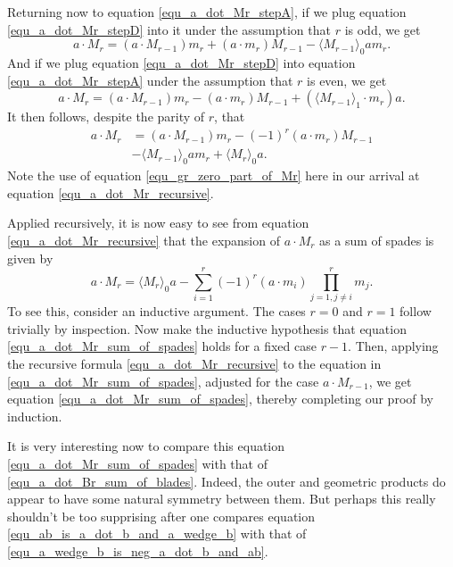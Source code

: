 \documentclass{birkjour}
\theoremstyle{definition}
\theoremstyle{remark}
\numberwithin{equation}{section}
\begin{document}
Returning now to equation \eqref{equ_a_dot_Mr_stepA}, if we plug equation \eqref{equ_a_dot_Mr_stepD} into it
under the assumption that $r$ is odd, we get
\begin{equation}
a\cdot M_r = (a\cdot M_{r-1})m_r + (a\cdot m_r)M_{r-1} - \langle M_{r-1}\rangle_0am_r.
\end{equation}
And if we plug equation \eqref{equ_a_dot_Mr_stepD} into equation \eqref{equ_a_dot_Mr_stepA} under the assumption
that $r$ is even, we get
\begin{equation}
a\cdot M_r = (a\cdot M_{r-1})m_r - (a\cdot m_r)M_{r-1} + (\langle M_{r-1}\rangle_1\cdot m_r)a.
\end{equation}
It then follows, despite the parity of $r$, that
\begin{align}
a\cdot M_r &= (a\cdot M_{r-1})m_r - (-1)^r(a\cdot m_r)M_{r-1}\nonumber \\
 &- \langle M_{r-1}\rangle_0am_r + \langle M_r\rangle_0a.\label{equ_a_dot_Mr_recursive}
\end{align}
Note the use of equation \eqref{equ_gr_zero_part_of_Mr} here in our arrival at equation \eqref{equ_a_dot_Mr_recursive}.

Applied recursively, it is now easy to see from equation \eqref{equ_a_dot_Mr_recursive} that the expansion of
$a\cdot M_r$ as a sum of spades is given by
\begin{equation}\label{equ_a_dot_Mr_sum_of_spades}
a\cdot M_r = \langle M_r\rangle_0a - \sum_{i=1}^r(-1)^r(a\cdot m_i)\prod_{j=1,j\neq i}^rm_j.
\end{equation}
To see this, consider an inductive argument.  The cases $r=0$ and $r=1$ follow trivially by inspection.
Now make the inductive hypothesis that equation \eqref{equ_a_dot_Mr_sum_of_spades} holds for a fixed case $r-1$.
Then, applying the recursive formula \eqref{equ_a_dot_Mr_recursive} to the equation in \eqref{equ_a_dot_Mr_sum_of_spades},
adjusted for the case $a\cdot M_{r-1}$, we get equation \eqref{equ_a_dot_Mr_sum_of_spades}, thereby completing
our proof by induction.

It is very interesting now to compare this equation \eqref{equ_a_dot_Mr_sum_of_spades} with that of \eqref{equ_a_dot_Br_sum_of_blades}.
Indeed, the outer and geometric products do appear to have some natural symmetry between them.  But perhaps this really shouldn't be
too supprising after one compares equation \eqref{equ_ab_is_a_dot_b_and_a_wedge_b} with that of \eqref{equ_a_wedge_b_is_neg_a_dot_b_and_ab}.

\end{document}
